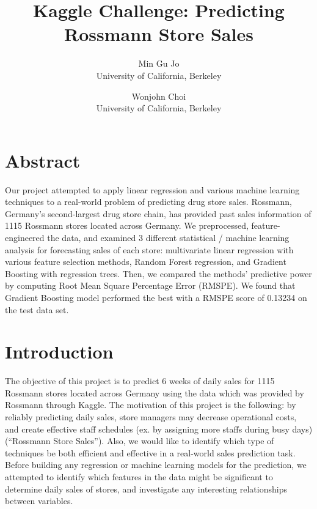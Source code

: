 \documentclass[letterpaper,twocolumn,11pt]{article}
\begin{document}
\date{}

\title{\Large \bf Kaggle Challenge: Predicting Rossmann Store Sales}

\author{
  {\rm Min Gu Jo}\\
  University of California, Berkeley
  \and
      {\rm Wonjohn Choi}\\
      University of California, Berkeley
} %

\maketitle

\thispagestyle{empty}


\section{Abstract}
Our project attempted to apply linear regression and various machine learning techniques to a real-world problem of predicting drug store sales. Rossmann, Germany's second-largest drug store chain, has provided past sales information of 1115 Rossmann stores located across Germany. We preprocessed, feature-engineered the data, and examined 3 different statistical / machine learning analysis for forecasting sales of each store: multivariate linear regression with various feature selection methods, Random Forest regression, and Gradient Boosting with regression trees. Then, we compared the methods' predictive power by computing Root Mean Square Percentage Error (RMSPE). We found that Gradient Boosting model performed the best with a RMSPE score of 0.13234 on the test data set.

\section{Introduction}
The objective of this project is to predict 6 weeks of daily sales for 1115 Rossmann stores located across Germany using the data which was provided by Rossmann through Kaggle. The motivation of this project is the following: by reliably predicting daily sales, store managers may decrease operational costs, and create effective staff schedules (ex. by assigning more staffs during busy days) (``Rossmann Store Sales''). Also, we would like to identify which type of techniques be both efficient and effective in a real-world sales prediction task. Before building any regression or machine learning models for the prediction, we attempted to identify which features in the data might be significant to determine daily sales of stores, and investigate any interesting relationships between variables.
\end{document}
